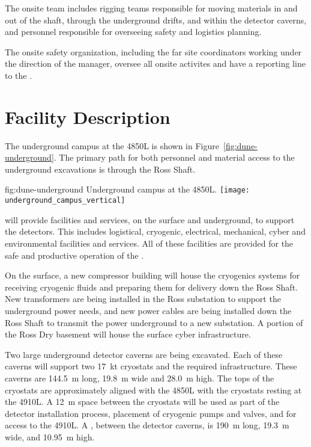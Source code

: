 The onsite  team includes rigging teams responsible for moving 
materials in and out of the shaft, through the underground drifts, 
and within the detector caverns, and personnel responsible 
for overseeing safety and logistics planning.  

The onsite safety organization, including the far site  coordinators
working under the direction of the  
manager, oversee all onsite activites and have a %
reporting line to the .

\section{Facility Description}
\label{sec:es-tc-facility}

The  underground campus at the  4850L is shown in
Figure~\ref{fig:dune-underground}. The primary path for both personnel 
and material access to the underground excavations is through the Ross Shaft.
\begin{dunefigure}{fig:dune-underground}
  {Underground campus at the 4850L.}
  \texttt{[image: underground\_campus\_vertical]}
\end{dunefigure}

 will provide facilities and services, on the surface and
underground, to support the  detectors.  This includes
logistical, cryogenic, electrical, mechanical, cyber and environmental
facilities and services.  All of these facilities are provided for the
safe and productive operation of the .

On the surface, a new compressor building will house the cryogenics
systems for receiving cryogenic fluids and preparing them for delivery
down the Ross Shaft.  New transformers are being installed in the Ross substation to support the underground power needs, and new power cables are
being installed down the Ross Shaft to transmit the power underground
to a new substation.  A portion of the Ross Dry basement will house the
surface cyber infrastructure.


Two large underground detector caverns
are being excavated.  Each of these caverns will support two
\SI{17}{\kilo\tonne} cryostats and the required infrastructure.  These caverns are \SI{144.5}{\meter} long, \SI{19.8}{\meter} wide and
\SI{28.0}{\meter} high. The tops of the cryostats are approximately
aligned with the 4850L with the cryostats resting
at the 4910L.  A \SI{12}{\meter} space between the cryostats will
be used as part of the detector installation process, placement of
cryogenic pumps and valves, and for access to the 4910L.  A
, between the detector caverns, is \SI{190}{\meter}
long, \SI{19.3}{\meter} wide, and \SI{10.95}{\meter} high.

